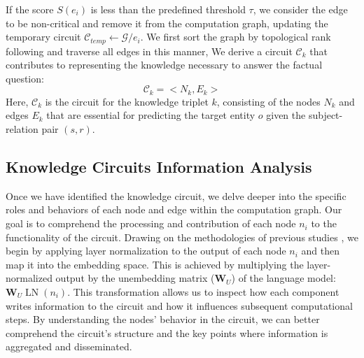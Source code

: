 If the score $S(e_{i})$ is less than the predefined threshold $\tau$, we consider the edge to be non-critical and remove it from the computation graph, updating the temporary circuit $\mathcal{C}_{temp} \leftarrow\mathcal{G}/e_{i}$. 
We first sort the graph by topological rank following \citet{acdc} and  traverse all edges in this manner, We derive a circuit $\mathcal{C}_{k}$ that contributes to representing the knowledge necessary to answer the factual question:
\begin{equation}
    \mathcal{C}_{k} = <N_{k}, E_{k}>
\end{equation}
Here, $\mathcal{C}_{k}$ is the circuit for the knowledge triplet $k$, consisting of the nodes $N_{k}$ and edges $E_{k}$ that are essential for predicting the target entity $o$ given the subject-relation pair $(s, r)$.


\subsection{Knowledge Circuits Information Analysis}
Once we have identified the knowledge circuit, we delve deeper into the specific roles and behaviors of each node and edge within the computation graph. 
Our goal is to comprehend the processing and contribution of each node $n_{i}$ to the functionality of the circuit.
Drawing on the methodologies of previous studies \cite{yu2024locating,katz-belinkov-2023-visit,nostalgebraist_interpreting_nodate}, we begin by applying layer normalization to the output of each node $n_{i}$ and then map it into the embedding space. 
This is achieved by multiplying the layer-normalized output by the unembedding matrix ($\mathbf{W}_U$) of the language model:
$\mathbf{W}_U \operatorname{LN}(n_{i})$.
This transformation allows us to inspect how each component writes information to the circuit and how it influences subsequent computational steps. 
By understanding the nodes' behavior in the circuit, we can better comprehend the circuit's structure and the key points where information is aggregated and disseminated.

